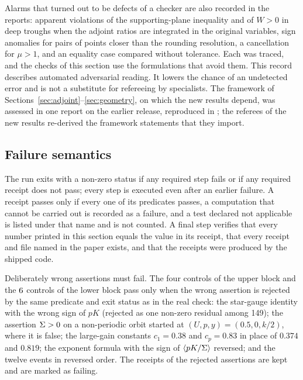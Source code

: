 Alarms that turned out to be defects of a checker are also recorded in the reports: apparent violations of the supporting-plane inequality and of $W>0$ in deep troughs when the adjoint ratios are integrated in the original variables, sign anomalies for pairs of points closer than the rounding resolution, a cancellation for $\mu>1$, and an equality case compared without tolerance. Each was traced, and the checks of this section use the formulations that avoid them. This record describes automated adversarial reading. It lowers the chance of an undetected error and is not a substitute for refereeing by specialists. The framework of Sections~\ref{sec:adjoint}--\ref{sec:geometry}, on which the new results depend, was assessed in one report on the earlier release, reproduced in ; the referees of the new results re-derived the framework statements that they import.

\subsection{Failure semantics}\label{num:sec:failure}
The run exits with a non-zero status if any required step fails or if any required receipt does not pass; every step is executed even after an earlier failure. A receipt passes only if every one of its predicates passes, a computation that cannot be carried out is recorded as a failure, and a test declared not applicable is listed under that name and is not counted. A final step verifies that every number printed in this section equals the value in its receipt, that every receipt and file named in the paper exists, and that the receipts were produced by the shipped code.

Deliberately wrong assertions must fail. The four controls of the upper block and the $6$ controls of the lower block pass only when the wrong assertion is rejected by the same predicate and exit status as in the real check: the star-gauge identity with the wrong sign of $pK$ (rejected as one non-zero residual among 149); the assertion $\Sigma>0$ on a non-periodic orbit started at $(U,p,y)=(0.5,0,k/2)$, where it is false; the large-gain constants $c_1=0.38$ and $c_p=0.83$ in place of $0.374$ and $0.819$; the exponent formula with the sign of $\left\langle pK/\Sigma\right\rangle$ reversed; and the twelve events in reversed order. The receipts of the rejected assertions are kept and are marked as failing.

